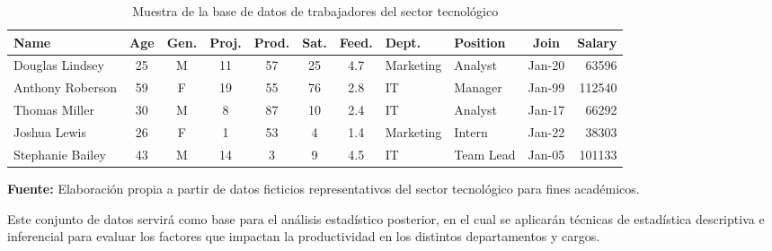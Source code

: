 \begin{table}[H]
\centering
\small
\begin{tabular}{|l|c|c|c|c|c|c|l|l|c|r|}
\hline
\textbf{Name} & \textbf{Age} & \textbf{Gen.} & \textbf{Proj.} & \textbf{Prod.} & \textbf{Sat.} & \textbf{Feed.} & \textbf{Dept.} & \textbf{Position} & \textbf{Join} & \textbf{Salary} \\
\hline
Douglas Lindsey & 25 & M & 11 & 57 & 25 & 4.7 & Marketing & Analyst & Jan-20 & 63596 \\
Anthony Roberson & 59 & F & 19 & 55 & 76 & 2.8 & IT & Manager & Jan-99 & 112540 \\
Thomas Miller & 30 & M & 8 & 87 & 10 & 2.4 & IT & Analyst & Jan-17 & 66292 \\
Joshua Lewis & 26 & F & 1 & 53 & 4 & 1.4 & Marketing & Intern & Jan-22 & 38303 \\
Stephanie Bailey & 43 & M & 14 & 3 & 9 & 4.5 & IT & Team Lead & Jan-05 & 101133 \\
\hline
\end{tabular}
\caption{Muestra de la base de datos de trabajadores del sector tecnológico}
\label{tab:sampledata}
\end{table}

\noindent\textbf{Fuente:} Elaboración propia a partir de datos ficticios representativos del sector tecnológico para fines académicos.

\vspace{0.5cm}
Este conjunto de datos servirá como base para el análisis estadístico posterior, en el cual se aplicarán técnicas de estadística descriptiva e inferencial para evaluar los factores que impactan la productividad en los distintos departamentos y cargos.

